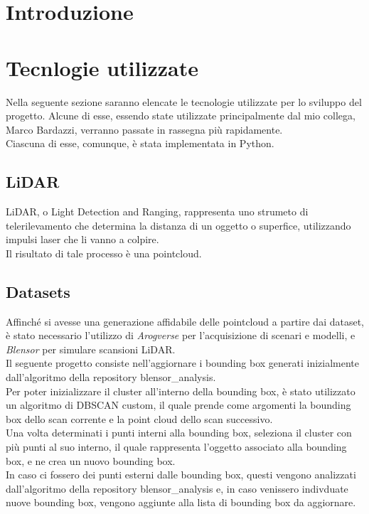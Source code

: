 \documentclass[italian]{article}
\begin{document}
\section*{Introduzione}
\section*{Tecnlogie utilizzate}
Nella seguente sezione saranno elencate le tecnologie utilizzate per lo sviluppo del progetto. Alcune di esse, essendo state utilizzate principalmente dal mio collega, Marco Bardazzi, verranno passate in rassegna più rapidamente.\\
Ciascuna di esse, comunque, è stata implementata in Python.
\subsection{LiDAR}
LiDAR, o Light Detection and Ranging, rappresenta uno strumeto di telerilevamento che determina la distanza di un oggetto o superfice, utilizzando impulsi laser che li vanno a colpire.\\
Il risultato di tale processo è una pointcloud.
\subsection{Datasets}
Affinché si avesse una generazione affidabile delle pointcloud a partire dai dataset, è stato necessario l'utilizzo di \textit{Arogverse} per l'acquisizione di scenari e modelli, e \textit{Blensor} per simulare scansioni LiDAR.\\


Il seguente progetto consiste nell'aggiornare i bounding box generati inizialmente dall'algoritmo della repository blensor\_analysis.\\
Per poter inizializzare il cluster all'interno della bounding box, è stato utilizzato un algoritmo di DBSCAN custom, il quale prende come argomenti la bounding box dello scan corrente e la point cloud dello scan successivo.\\
Una volta determinati i punti interni alla bounding box, seleziona il cluster con più punti al suo interno, il quale rappresenta l'oggetto associato alla bounding box, e ne crea un nuovo bounding box.\\
In caso ci fossero dei punti esterni dalle bounding box, questi vengono analizzati dall'algoritmo della repository blensor\_analysis e, in caso venissero indivduate nuove bounding box, vengono aggiunte alla lista di bounding box da aggiornare.\\
\end{document}
